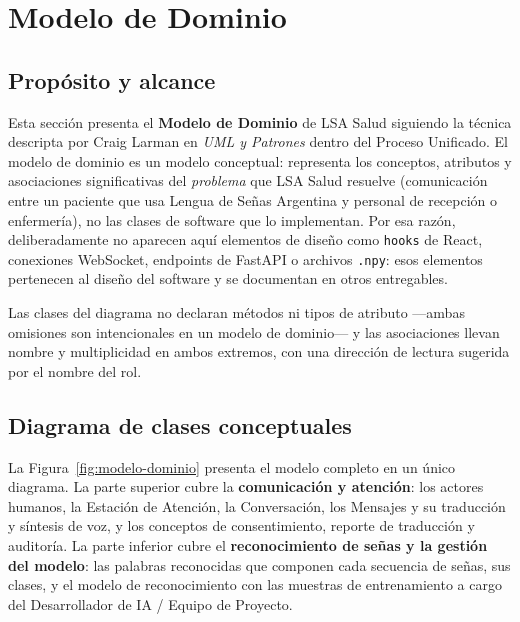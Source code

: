 \section{Modelo de Dominio}

\subsection{Propósito y alcance}

Esta sección presenta el \textbf{Modelo de Dominio} de LSA Salud siguiendo
la técnica descripta por Craig Larman en \textit{UML y Patrones} dentro del
Proceso Unificado. El modelo de dominio es un modelo conceptual: representa
los conceptos, atributos y asociaciones significativas del \emph{problema}
que LSA Salud resuelve (comunicación entre un paciente que usa Lengua de
Señas Argentina y personal de recepción o enfermería), no las clases de
software que lo implementan. Por esa razón, deliberadamente no aparecen aquí
elementos de diseño como \texttt{hooks} de React, conexiones WebSocket,
endpoints de FastAPI o archivos \texttt{.npy}: esos elementos pertenecen al
diseño del software y se documentan en otros entregables.

Las clases del diagrama no declaran métodos ni tipos de atributo —ambas
omisiones son intencionales en un modelo de dominio— y las asociaciones
llevan nombre y multiplicidad en ambos extremos, con una dirección de
lectura sugerida por el nombre del rol.

\subsection{Diagrama de clases conceptuales}

La Figura~\ref{fig:modelo-dominio} presenta el modelo completo en un único
diagrama. La parte superior cubre la \textbf{comunicación y atención}: los
actores humanos, la Estación de Atención, la Conversación, los Mensajes y
su traducción y síntesis de voz, y los conceptos de consentimiento, reporte
de traducción y auditoría. La parte inferior cubre el \textbf{reconocimiento
de señas y la gestión del modelo}: las palabras reconocidas que componen
cada secuencia de señas, sus clases, y el modelo de reconocimiento con las
muestras de entrenamiento a cargo del Desarrollador de IA / Equipo de
Proyecto.

